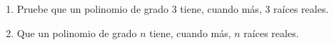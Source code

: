 \item 
\begin{enumerate}
        \item[(a)] Pruebe que un polinomio de grado 3 tiene, cuando más, 3 raíces reales.
        \item[(b)] Que un polinomio de grado $n$ tiene, cuando más, $n$ raíces reales.
    \end{enumerate}
